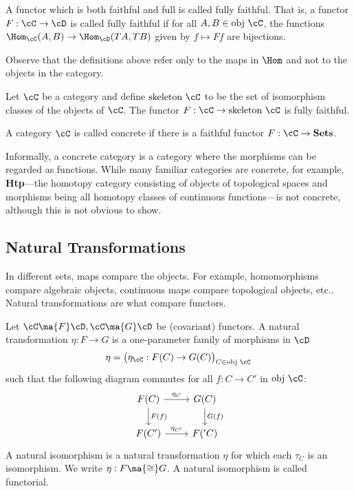 \begin{dfn}
A functor which is both faithful and full is called fully faithful. That is, a functor $F: \cC \rightarrow \cD$ is called fully faithful if for all $A,B \in \text{obj }\cC$, the functions $\Hom_{\cC}(A,B) \rightarrow \Hom_{\cD}(TA,TB)$ given by $f \mapsto Ff$ are bijections. 
\end{dfn}


\begin{rem}
Observe that the definitions above refer only to the maps in $\Hom$ and not to the objects in the category. 
\end{rem}


\begin{ex}
Let $\cC$ be a category and define $\text{skeleton }\cC$ to be the set of isomorphism classes of the objects of $\cC$. The functor $F: \cC \rightarrow \text{skeleton }\cC$ is fully faithful. 
\end{ex}


\begin{dfn}[Concrete]
A category $\cC$ is called concrete if there is a faithful functor $F: \cC \to \textbf{Sets}$. 
\end{dfn}


Informally, a concrete category is a category where the morphisms can be regarded as functions. While many familiar categories are concrete, for example, \textbf{Htp}---the homotopy category consisting of objects of topological spaces and morphisms being all homotopy classes of continuous functions---is not concrete, although this is not obvious to show. 



\subsection{Natural Transformations} 



In different sets, maps compare the objects. For example, homomorphisms compare algebraic objects, continuous maps compare topological objects, etc.. Natural transformations are what compare functors. 


\begin{dfn}
Let $\cC \ma{F} \cD,\cC \ma{G} \cD$ be (covariant) functors. A natural transformation $\eta: F \rightarrow G$ is a one-parameter family of morphisms in $\cD$
	\[
	\eta= \big(\eta_{\cC}: F(C) \rightarrow G(C) \big)_{C \in \text{obj }\cC}
	\]
such that the following diagram commutes for all $f: C \rightarrow C'$ in $\text{obj }\cC$:
	\[
	\begin{tikzcd}
	F(C) \arrow{r}{\eta_C} \arrow{d}{F(f)} & G(C) \arrow{d}{G(f)} \\
	F(C') \arrow{r}{\eta_{C'}} & F('C) 
	\end{tikzcd}
	\]
A natural isomorphism is a natural transformation $\eta$ for which each $\tau_C$ is an isomorphism. We write $\eta: F \ma{\cong} G$. A natural isomorphism is called functorial. 
\end{dfn}


